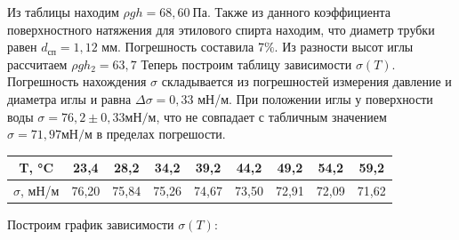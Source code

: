 \documentclass[a4paper, 12pt]{article}
\begin{document}
		Из таблицы находим $\rho gh = 68,60\: Па$. Также из данного коэффициента поверхностного натяжения для этилового спирта находим, что диаметр трубки равен $d_{сп}=1,12$ мм. Погрешность составила 7$\%$. Из разности высот иглы рассчитаем $\rho gh_2 = 63,7$ Теперь построим таблицу зависимости $\sigma (T)$. 
        Погрешность нахождения $\sigma$ складывается из погрешностей измерения давление и диаметра иглы и равна $\Delta \sigma = 0,33$ мН/м. 
        При положении иглы у поверхности воды $\sigma = 76,2 \pm 0,33 {мН/м}$, что не совпадает с табличным значением $\sigma = 71,97 {мН/м}$ в пределах погрешости.
		\begin{longtable}[H]{|c|c|c|c|c|c|c|c|c|}
			\hline
			T, °C & 23,4 & 28,2 & 34,2 & 39,2 & 44,2 & 49,2 & 54,2 & 59,2\\
			\hline
			$\sigma$, мН/м & 76,20 & 75,84 & 75,26 & 74,67 & 73,50 & 72,91 & 72,09 & 71,62\\
			\hline
		\end{longtable}
	
		Построим график зависимости $\sigma (T)$:
		
		\begin{figure}[h]
		\end{figure}
	
\end{document}
